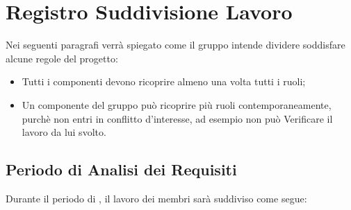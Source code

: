 \newpage



\section{Registro Suddivisione Lavoro}
Nei seguenti paragrafi verrà spiegato come il gruppo intende dividere soddisfare alcune regole del progetto:
\begin{itemize}
	\item Tutti i componenti devono ricoprire almeno una volta tutti i ruoli; 
	\item Un componente del gruppo può ricoprire più ruoli contemporaneamente, purchè non entri in conflitto d'interesse, ad esempio non può Verificare il lavoro da lui svolto.
\end{itemize}

\subsection{Periodo di Analisi dei Requisiti}
Durante il periodo di \AdR, il lavoro dei membri sarà suddiviso come segue:

